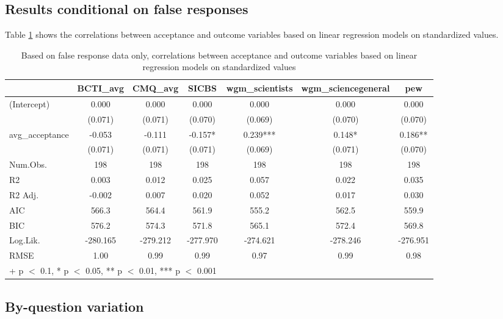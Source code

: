 \documentclass[
  doc,floatsintext]{apa6}
\begin{document}
\subsection{Results conditional on false responses}\label{results-conditional-on-false-responses-3}

Table \ref{tab:exp4-false-response-regression} shows the correlations between acceptance and outcome variables based on linear regression models on standardized values.

\begin{table}

\caption{\label{tab:exp4-false-response-regression}Based on false response data only, correlations between acceptance and outcome variables based on linear regression models on standardized values}
\centering
\begin{tabular}[t]{lcccccc}
\toprule
  & BCTI\_avg & CMQ\_avg & SICBS & wgm\_scientists & wgm\_sciencegeneral & pew\\
\midrule
(Intercept) & 0.000 & 0.000 & 0.000 & 0.000 & 0.000 & 0.000\\
 & (0.071) & (0.071) & (0.070) & (0.069) & (0.070) & (0.070)\\
avg\_acceptance & -0.053 & -0.111 & -0.157* & 0.239*** & 0.148* & 0.186**\\
 & (0.071) & (0.071) & (0.071) & (0.069) & (0.071) & (0.070)\\
\midrule
Num.Obs. & 198 & 198 & 198 & 198 & 198 & 198\\
R2 & 0.003 & 0.012 & 0.025 & 0.057 & 0.022 & 0.035\\
R2 Adj. & -0.002 & 0.007 & 0.020 & 0.052 & 0.017 & 0.030\\
AIC & 566.3 & 564.4 & 561.9 & 555.2 & 562.5 & 559.9\\
BIC & 576.2 & 574.3 & 571.8 & 565.1 & 572.4 & 569.8\\
Log.Lik. & -280.165 & -279.212 & -277.970 & -274.621 & -278.246 & -276.951\\
RMSE & 1.00 & 0.99 & 0.99 & 0.97 & 0.99 & 0.98\\
\bottomrule
\multicolumn{7}{l}{\rule{0pt}{1em}+ p $<$ 0.1, * p $<$ 0.05, ** p $<$ 0.01, *** p $<$ 0.001}\\
\end{tabular}
\end{table}

\subsection{By-question variation}\label{by-question-variation-3}
\end{document}
